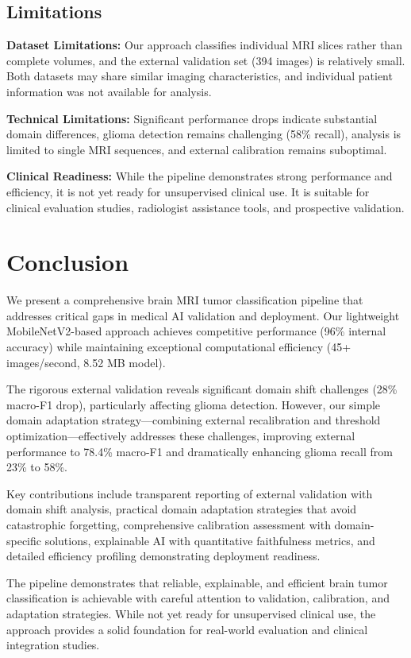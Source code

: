 \documentclass[11pt,a4paper]{article}
\begin{document}
\subsection{Limitations}

\textbf{Dataset Limitations:} Our approach classifies individual MRI slices rather than complete volumes, and the external validation set (394 images) is relatively small. Both datasets may share similar imaging characteristics, and individual patient information was not available for analysis.

\textbf{Technical Limitations:} Significant performance drops indicate substantial domain differences, glioma detection remains challenging (58\% recall), analysis is limited to single MRI sequences, and external calibration remains suboptimal.

\textbf{Clinical Readiness:} While the pipeline demonstrates strong performance and efficiency, it is not yet ready for unsupervised clinical use. It is suitable for clinical evaluation studies, radiologist assistance tools, and prospective validation.

\section{Conclusion}

We present a comprehensive brain MRI tumor classification pipeline that addresses critical gaps in medical AI validation and deployment. Our lightweight MobileNetV2-based approach achieves competitive performance (96\% internal accuracy) while maintaining exceptional computational efficiency (45+ images/second, 8.52 MB model).

The rigorous external validation reveals significant domain shift challenges (28\% macro-F1 drop), particularly affecting glioma detection. However, our simple domain adaptation strategy—combining external recalibration and threshold optimization—effectively addresses these challenges, improving external performance to 78.4\% macro-F1 and dramatically enhancing glioma recall from 23\% to 58\%.

Key contributions include transparent reporting of external validation with domain shift analysis, practical domain adaptation strategies that avoid catastrophic forgetting, comprehensive calibration assessment with domain-specific solutions, explainable AI with quantitative faithfulness metrics, and detailed efficiency profiling demonstrating deployment readiness.

The pipeline demonstrates that reliable, explainable, and efficient brain tumor classification is achievable with careful attention to validation, calibration, and adaptation strategies. While not yet ready for unsupervised clinical use, the approach provides a solid foundation for real-world evaluation and clinical integration studies.
\end{document}
